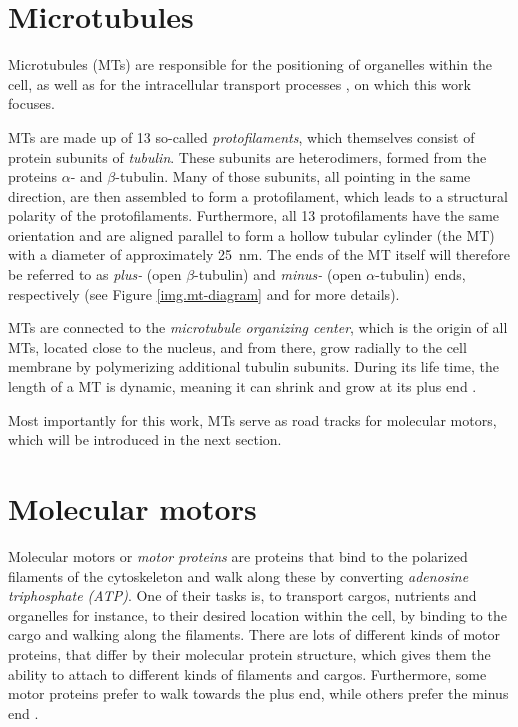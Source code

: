 \section{Microtubules}\label{s.microtubuli}
Microtubules (MTs) are responsible for the positioning of organelles within the cell, as well as for the intracellular transport processes \cite{alberts}, on which this work focuses.

MTs are made up of 13 so-called \textit{protofilaments}, which themselves consist of protein subunits of \textit{tubulin}. These subunits are heterodimers, formed from the proteins $\alpha$- and
$\beta$-tubulin. Many of those subunits, all pointing in the same direction, are then assembled to form a protofilament, which leads to a structural polarity of the protofilaments. Furthermore, all
13 protofilaments have the same orientation and are aligned parallel to form a hollow tubular cylinder (the MT) with a diameter of approximately \SI{25}{\nano\meter}. The ends of the MT itself will
therefore be referred to as \textit{plus-} (open $\beta$-tubulin) and \textit{minus-} (open $\alpha$-tubulin) ends, respectively (see Figure \ref{img.mt-diagram} and \cite{alberts} for more details).


MTs are connected to the \textit{microtubule organizing center}, which is the origin of all MTs, located close to the nucleus, and from there, grow radially to the cell membrane by polymerizing
additional tubulin subunits. During its life time, the length of a MT is dynamic, meaning it can shrink and grow at its plus end \cite{alberts, cmls58}.

Most importantly for this work, MTs serve as road tracks for molecular motors, which will be introduced in the next section.

\section{Molecular motors}\label{s.mol-motors}
Molecular motors or \textit{motor proteins} are proteins that bind to the polarized filaments of the cytoskeleton and walk along these by converting \textit{adenosine triphosphate (ATP)}. One of their tasks
is, to transport cargos, nutrients and organelles for instance, to their desired location within the cell, by binding to the cargo and walking along the filaments. There are lots of different kinds of
motor proteins, that differ by their molecular protein structure, which gives them the ability to attach to different kinds of filaments and cargos. Furthermore, some motor proteins prefer to walk towards
the plus end, while others prefer the minus end \cite{alberts}.

